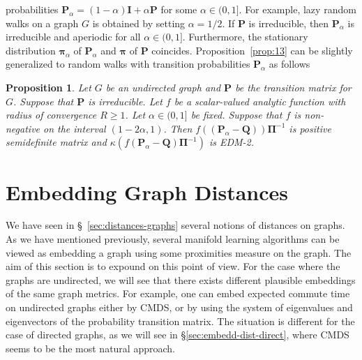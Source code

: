 \documentclass[10pt,twocolumn]{article}
\newtheorem{proposition}[theorem]{Proposition}
\numberwithin{equation}{section}
\begin{document}
probabilities $\mathbf{P}_{\alpha} = (1 - \alpha)\mathbf{I} +
\alpha \mathbf{P}$ for some $\alpha \in (0,1]$. For example, lazy
random walks on a graph $G$ is obtained by setting $\alpha = 1/2$. If
$\mathbf{P}$ is irreducible, then
$\mathbf{P}_{\alpha}$ is irreducible and aperiodic for
all $\alpha \in (0,1]$. Furthermore, the stationary distribution
$\bm{\pi}_{\alpha}$ of $\mathbf{P}_{\alpha}$ and $\bm{\pi}$ of $\mathbf{P}$ 
coincides. Proposition~\ref{prop:13} can be slightly 
generalized to random walks with transition probabilities
$\mathbf{P}_{\alpha}$ as follows
\begin{proposition}
  \label{prop:8}
  Let $G$ be an undirected graph and $\mathbf{P}$ be the transition
  matrix for 
  $G$. Suppose that $\mathbf{P}$ is irreducible. Let
  $f$ be a scalar-valued analytic function with radius of convergence
  $R \geq 1$. Let $\alpha \in (0,1]$ be fixed. Suppose that $f$ is
  non-negative on the interval $(1 - 2\alpha,1)$. Then $f((\mathbf{P}_{\alpha}
  - \mathbf{Q}))\bm{\Pi}^{-1}$ is positive
  semidefinite matrix and $\kappa(f(\mathbf{P}_{\alpha} -
  \mathbf{Q})\bm{\Pi}^{-1})$ is EDM-2.
\end{proposition}

\section{Embedding Graph Distances}
\label{sec:from-dist-embedd}
We have seen in \S~\ref{sec:distances-graphs} several notions of
distances on graphs. As we have mentioned previously, several manifold
learning algorithms can be viewed as embedding a graph using some
proximities measure on the graph. The aim of this section is to
expound on this point of view. For the case where the graphs are
undirected, we will see that there exists different plausible
embeddings of the same graph metrics. For example, one can embed
expected commute time on undirected graphs either by CMDS, or
by using the system of eigenvalues and eigenvectors of the probability
transition matrix. The situation is different for the case of directed
graphs, as we will see in \S \ref{sec:embedd-dist-direct}, where
CMDS seems to be the most natural approach.
%
\end{document}
